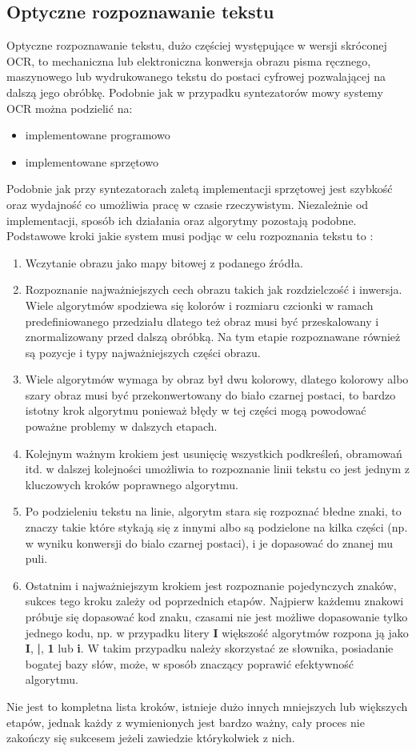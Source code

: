 \subsection{Optyczne rozpoznawanie tekstu}
Optyczne rozpoznawanie tekstu, dużo częściej występujące w wersji skróconej OCR, to mechaniczna lub elektroniczna konwersja obrazu pisma ręcznego, maszynowego lub wydrukowanego tekstu do postaci cyfrowej pozwalającej na dalszą jego obróbkę. Podobnie jak w przypadku syntezatorów mowy systemy OCR można podzielić na:
\begin{itemize}
	\item implementowane programowo
	\item implementowane sprzętowo
\end{itemize}
Podobnie jak przy syntezatorach zaletą implementacji sprzętowej jest szybkość oraz wydajność co umożliwia pracę w czasie rzeczywistym. Niezależnie od implementacji, sposób ich działania oraz algorytmy pozostają podobne. Podstawowe kroki jakie system musi podjąc w celu rozpoznania tekstu to \cite{noor2005} :
\begin{enumerate}
	\item Wczytanie obrazu jako mapy bitowej z podanego źródła.
	\item Rozpoznanie najważniejszych cech obrazu takich jak rozdzielczość i inwersja. Wiele algorytmów spodziewa się kolorów i rozmiaru czcionki w ramach predefiniowanego przedziału dlatego też obraz musi być przeskalowany i znormalizowany przed dalszą obróbką. Na tym etapie rozpoznawane również są pozycje i typy najważniejszych części obrazu.
	\item Wiele algorytmów wymaga by obraz był dwu kolorowy, dlatego kolorowy albo szary obraz musi być przekonwertowany do biało czarnej postaci, to bardzo istotny krok algorytmu ponieważ błędy w tej części mogą powodować poważne problemy w dalszych etapach.
	\item Kolejnym ważnym krokiem jest usunięcię wszystkich podkreśleń, obramowań itd. w dalszej kolejności umożliwia to rozpoznanie linii tekstu co jest jednym z kluczowych kroków poprawnego algorytmu.
	\item Po podzieleniu tekstu na linie, algorytm stara się rozpoznać błedne znaki, to znaczy takie które stykają się z innymi albo są podzielone na kilka części (np. w wyniku konwersji do bialo czarnej postaci), i je dopasować do znanej mu puli.
	\item Ostatnim i najważniejszym krokiem jest rozpoznanie pojedynczych znaków, sukces tego kroku zależy od poprzednich etapów. Najpierw każdemu znakowi próbuje się dopasować kod znaku, czasami nie jest możliwe dopasowanie tylko jednego kodu, np. w przypadku litery \textbf{I} większość algorytmów rozpona ją jako \textbf{I}, \textbf{|}, \textbf{1} lub \textbf{i}. W takim przypadku należy skorzystać ze słownika, posiadanie bogatej bazy słów, może, w sposób znaczący poprawić efektywność algorytmu.
\end{enumerate}
Nie jest to kompletna lista kroków, istnieje dużo innych mniejszych lub większych etapów, jednak każdy z wymienionych jest bardzo ważny, cały proces nie zakończy się sukcesem jeżeli zawiedzie którykolwiek z nich. 
